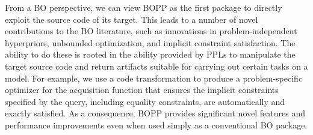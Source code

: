 From a BO perspective, we can view BOPP as the first package to directly exploit the source code of its target.
This leads to a number of novel contributions to the BO literature, such as innovations in 
problem-independent hyperpriors, unbounded optimization, and implicit constraint satisfaction.  
The ability to do these is rooted
in the ability provided by PPLs to manipulate the target source code and return artifacts suitable for carrying
out certain tasks on a model.  For example, we use a code transformation to produce a problem-specific
optimizer for the acquisition function that ensures the implicit constraints specified by the query, including equality constraints, are automatically and exactly
satisfied.  As a consequence, BOPP provides significant novel features and performance
improvements even when used simply as a conventional BO package.